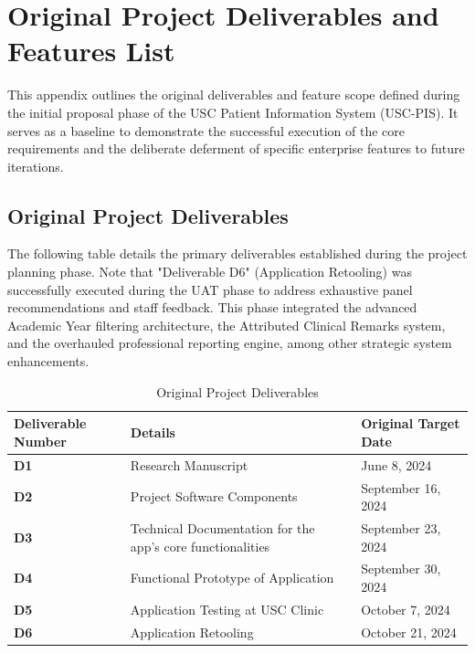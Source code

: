 
\chapter{Original Project Deliverables and Features List}
\label{appendix:deliverables}

This appendix outlines the original deliverables and feature scope defined during the initial proposal phase of the USC Patient Information System (USC-PIS). It serves as a baseline to demonstrate the successful execution of the core requirements and the deliberate deferment of specific enterprise features to future iterations.

\section{Original Project Deliverables}
The following table details the primary deliverables established during the project planning phase. Note that "Deliverable D6" (Application Retooling) was successfully executed during the UAT phase to address exhaustive panel recommendations and staff feedback. This phase integrated the advanced Academic Year filtering architecture, the Attributed Clinical Remarks system, and the overhauled professional reporting engine, among other strategic system enhancements.

\begin{table}[htbp]
\centering
\caption{Original Project Deliverables}
\begin{tabular}{|l|p{8cm}|l|}
\hline
\textbf{Deliverable Number} & \textbf{Details} & \textbf{Original Target Date} \\
\hline
\textbf{D1} & Research Manuscript & June 8, 2024 \\
\hline
\textbf{D2} & Project Software Components & September 16, 2024 \\
\hline
\textbf{D3} & Technical Documentation for the app's core functionalities & September 23, 2024 \\
\hline
\textbf{D4} & Functional Prototype of Application & September 30, 2024 \\
\hline
\textbf{D5} & Application Testing at USC Clinic & October 7, 2024 \\
\hline
\textbf{D6} & Application Retooling & October 21, 2024 \\
\hline
\end{tabular}
\end{table}

